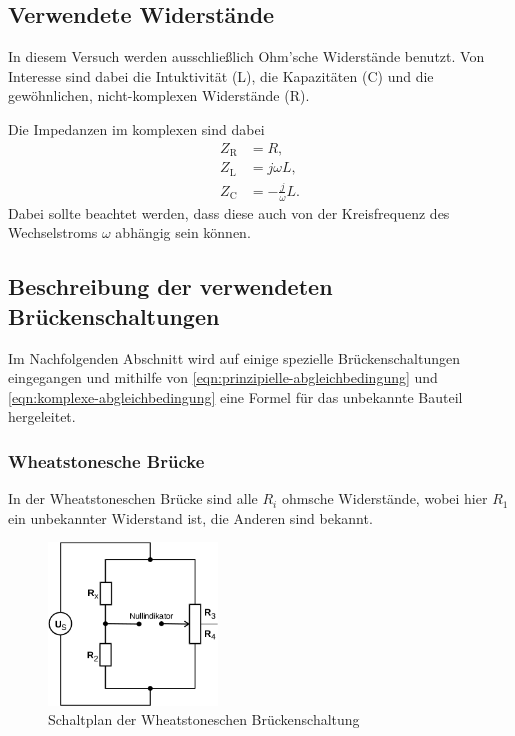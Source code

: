 \subsection{Verwendete Widerstände}
\label{seq:widerstände}
In diesem Versuch werden ausschließlich Ohm'sche Widerstände benutzt. Von Interesse sind dabei
die Intuktivität (L), die Kapazitäten (C) und die gewöhnlichen, 
nicht-komplexen Widerstände (R).

Die Impedanzen im komplexen sind dabei
\begin{align}
	Z_\text{R} &= R, \\
	Z_\text{L} &= j\omega L, \\
	Z_\text{C} &= -\frac{j}{\omega} L.
	\label{eqn:impedanzen}
\end{align}
Dabei sollte beachtet werden, dass diese auch von der Kreisfrequenz des Wechselstroms $\omega$ 
abhängig sein können. 

\subsection{Beschreibung der verwendeten Brückenschaltungen}
\label{sec:spezielle-Schaltungen}

Im Nachfolgenden Abschnitt wird auf einige spezielle Brückenschaltungen eingegangen und mithilfe von
\autoref{eqn:prinzipielle-abgleichbedingung} und \autoref{eqn:komplexe-abgleichbedingung} 
eine Formel für das unbekannte Bauteil hergeleitet.

\subsubsection{Wheatstonesche Brücke}
\label{sec:theorie-wheatstone}
In der Wheatstoneschen Brücke sind alle $R_i$ ohmsche Widerstände, wobei hier $R_1$ ein unbekannter
Widerstand ist, die Anderen sind bekannt.

\begin{figure}[H]
	\centering
	\includegraphics[width=0.4\textwidth]{bilder/wheatstone.png}
	\caption{Schaltplan der Wheatstoneschen Brückenschaltung \cite{sample}}
	\label{fig:wheatstone-bruecke}
\end{figure}

